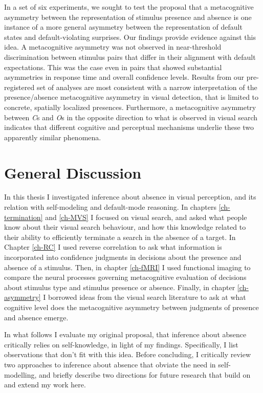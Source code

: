 \documentclass[12pt,twoside]{reedthesis}
\begin{document}
In a set of six experiments, we sought to test the proposal that a metacognitive asymmetry between the representation of stimulus presence and absence is one instance of a more general asymmetry between the representation of default states and default-violating surprises. Our findings provide evidence against this idea. A metacognitive asymmetry was not observed in near-threshold discrimination between stimulus pairs that differ in their alignment with default expectations. This was the case even in pairs that showed substantial asymmetries in response time and overall confidence levels. Results from our pre-registered set of analyses are most consistent with a narrow interpretation of the presence/absence metacognitive asymmetry in visual detection, that is limited to concrete, spatially localized presences. Furthermore, a metacognitive asymmetry between \emph{C}s and \emph{O}s in the opposite direction to what is observed in visual search indicates that different cognitive and perceptual mechanisms underlie these two apparently similar phenomena.

\hypertarget{general-discussion}{%
\chapter*{General Discussion}\label{general-discussion}}

In this thesis I investigated inference about absence in visual perception, and its relation with self-modeling and default-mode reasoning. In chapters \ref{ch-termination} and \ref{ch-MVS} I focused on visual search, and asked what people know about their visual search behaviour, and how this knowledge related to their ability to efficiently terminate a search in the absence of a target. In Chapter \ref{ch-RC} I used reverse correlation to ask what information is incorporated into confidence judgments in decisions about the presence and absence of a stimulus. Then, in chapter \ref{ch-fMRI} I used functional imaging to compare the neural processes governing metacognitive evaluation of decisions about stimulus type and stimulus presence or absence. Finally, in chapter \ref{ch-asymmetry} I borrowed ideas from the visual search literature to ask at what cognitive level does the metacognitive asymmetry between judgments of presence and absence emerge.

In what follows I evaluate my original proposal, that inference about absence critically relies on self-knowledge, in light of my findings. Specifically, I list observations that don't fit with this idea. Before concluding, I critically review two approaches to inference about absence that obviate the need in self-modelling, and briefly describe two directions for future research that build on and extend my work here.
\end{document}
